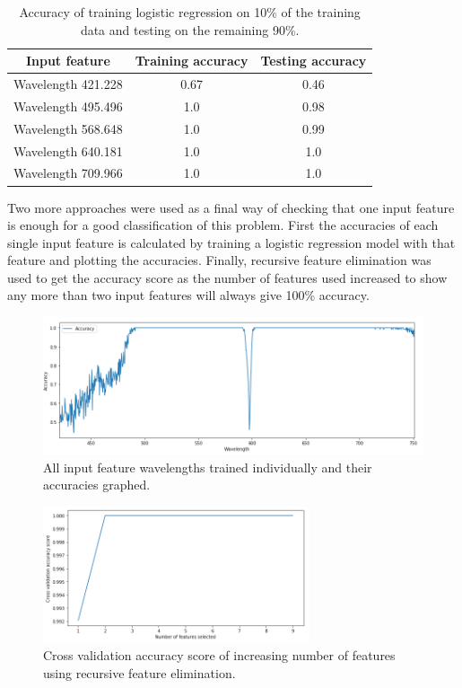 \documentclass{article}
\begin{document}
\begin{table}[H]
\centering
\begin{tabular}{| c | c | c |}
\hline
\textbf{Input feature} & \textbf{Training accuracy} & \textbf{Testing accuracy}\\
\hline
Wavelength 421.228 & 0.67 & 0.46\\
\hline
Wavelength 495.496 & 1.0 & 0.98\\
\hline
Wavelength 568.648 & 1.0 & 0.99\\
\hline
Wavelength 640.181 & 1.0 & 1.0\\
\hline
Wavelength 709.966 & 1.0 & 1.0\\
\hline
\end{tabular}
\caption{Accuracy of training logistic regression on 10\% of the training data and testing on the remaining 90\%.}
\end{table}
Two more approaches were used as a final way of checking that one input feature is enough for a good classification of this problem. First the accuracies of each single input feature is calculated by training a logistic regression model with that feature and plotting the accuracies. Finally, recursive feature elimination was used to get the accuracy score as the number of features used increased to show any more than two input features will always give 100\% accuracy. 
\begin{figure}[H]
\centering
\includegraphics[width=1\textwidth]{imgs/binary-accuracy.png}
\caption{All input feature wavelengths trained individually and their accuracies graphed.}
\label{fig:binary-accuracy}
\end{figure}
%
\begin{figure}[H]
\centering
\includegraphics[width=0.7\textwidth, keepaspectratio]{imgs/binary-numfeatures.png}
\caption{Cross validation accuracy score of increasing number of features using recursive feature elimination.}
\label{fig:binary-accuracyrfecv}
\end{figure}
\end{document}
